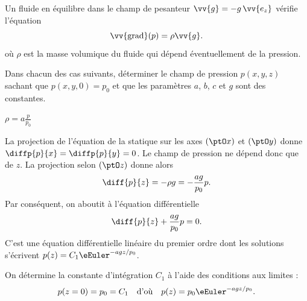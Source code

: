 
\hauteurLargeurCadreReponse		{7mm}{4cm}
\typeEntrainement				{} %
\initialisationEntrainement

Un fluide en équilibre dans le champ de pesanteur $\vv{g}=-g\,\vv{e_z}$ vérifie l'équation 
\[
\vv{\text{grad}}(p)=\rho \vv{g}.
\]
où $\rho$ est la masse volumique du fluide qui dépend éventuellement de la pression. 

Dans chacun des cas suivants, déterminer le champ de pression $p(x,y,z)$ sachant que $p(x,y,0)=p_0$ et que les paramètres $a$, $b$, $c$ et $g$ sont des constantes.
\debutEntrainement


\begin{enonce}
$\rho=a\frac{p}{p_0}$
\end{enonce}


\begin{corrige}
La projection de l'équation de la statique sur les axes $(\ptO x)$ et $(\ptO y)$ donne $\diffp{p}{x}=\diffp{p}{y}=0$. Le champ de pression ne dépend donc que de $z$. La projection selon $(\ptO z)$ donne alors
\[
\diff{p}{z}=-\rho g=-\frac{ag}{p_0}p.
\]
Par conséquent, on aboutit à l'équation différentielle
\[
\diff{p}{z}	+\frac{ag}{p_0}p=0.
\]
C'est une équation différentielle linéaire du premier ordre dont les solutions s'écrivent $p(z)=C_1\eEuler^{-agz/p_0}$. 

On détermine la constante d'intégration $C_1$ à l'aide des conditions aux limites : 
\[
p(z=0)=p_0=C_1
\quad\text{d'où}\quad
p(z)=p_0\eEuler^{-agz/p_0}.
\]
\end{corrige}

